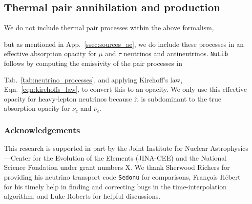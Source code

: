 \documentclass[aps,floatfix,prd,superscriptaddress,twocolumn]{revtex4-1}
\newcommand{\todo}[1]{\marginpar{\tiny{\textcolor{red}{#1}}}}
\renewcommand\todo[1]{} %
\begin{document}
\subsection{Thermal pair annihilation and production}
\label{ssec:sources_pp}
We do not include thermal pair processes within the above formalism,
\todo{explain this choice, and cite \cite{keil2003-pinched_spectra} or someone}
but as mentioned in App.~\ref{ssec:sources_ae}, we do include
these processes in an effective absorption opacity for $\mu$ and $\tau$
neutrinos and antineutrinos. \lstinline{NuLib} follows
\cite{brue1985-core_collapse,burr2006-neutrino_opacities}
by computing the emissivity of the pair processes in
\todo{describe better}
Tab.~\ref{tab:neutrino_processes}, and applying Kirchoff's law,
Eqn.~\ref{eqn:kirchoffs_law}, to convert this to an opacity.
We only use this effective opacity for heavy-lepton neutrinos because
it is subdominant to the true absorption opacity for
$\nu_e$ and $\bar{\nu}_e$.

\subsubsection*{Acknowledgements}
This research is supported in part by the Joint Institute for Nuclear
Astrophysics---Center for the Evolution of the Elements (JINA-CEE)
and the National Science Fondation under grant numbers X. \todo{grant nos?}
We thank Sherwood Richers for providing his neutrino transport code
\lstinline{Sedonu} for comparisons,
Fran\c{c}ois H\'{e}bert for his timely help in finding and
correcting bugs in the time-interpolation algorithm,
and Luke Roberts for helpful discussions.


\end{document}
